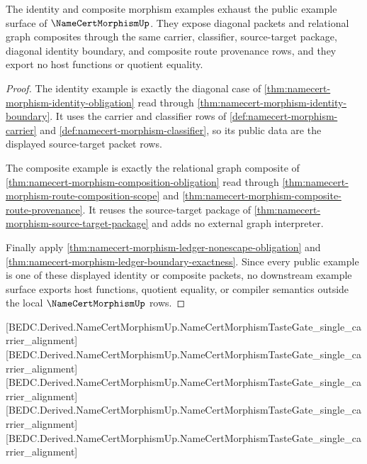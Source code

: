 \begin{theorem}
\label{thm:namecert-morphism-downstream-example-boundary}
The identity and composite morphism examples exhaust the public example surface of $\NameCertMorphismUp$. They expose diagonal packets and relational graph composites through the same carrier, classifier, source-target package, diagonal identity boundary, and composite route provenance rows, and they export no host functions or quotient equality.
\end{theorem}
\begin{proof}
The identity example is exactly the diagonal case of \autoref{thm:namecert-morphism-identity-obligation} read through \autoref{thm:namecert-morphism-identity-boundary}. It uses the carrier and classifier rows of \autoref{def:namecert-morphism-carrier} and \autoref{def:namecert-morphism-classifier}, so its public data are the displayed source-target packet rows.

The composite example is exactly the relational graph composite of \autoref{thm:namecert-morphism-composition-obligation} read through \autoref{thm:namecert-morphism-route-composition-scope} and \autoref{thm:namecert-morphism-composite-route-provenance}. It reuses the source-target package of \autoref{thm:namecert-morphism-source-target-package} and adds no external graph interpreter.

Finally apply \autoref{thm:namecert-morphism-ledger-nonescape-obligation} and \autoref{thm:namecert-morphism-ledger-boundary-exactness}. Since every public example is one of these displayed identity or composite packets, no downstream example surface exports host functions, quotient equality, or compiler semantics outside the local $\NameCertMorphismUp$ rows.
\end{proof}

[BEDC.Derived.NameCertMorphismUp.NameCertMorphismTasteGate\_single\_carrier\_alignment]
[BEDC.Derived.NameCertMorphismUp.NameCertMorphismTasteGate\_single\_carrier\_alignment]
[BEDC.Derived.NameCertMorphismUp.NameCertMorphismTasteGate\_single\_carrier\_alignment]
[BEDC.Derived.NameCertMorphismUp.NameCertMorphismTasteGate\_single\_carrier\_alignment]
[BEDC.Derived.NameCertMorphismUp.NameCertMorphismTasteGate\_single\_carrier\_alignment]

